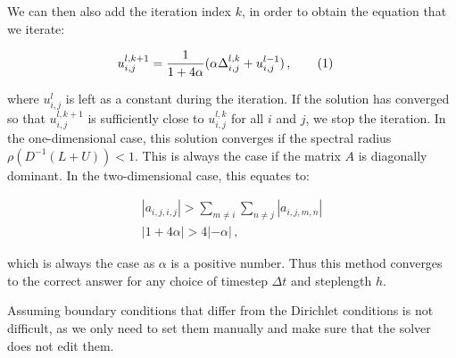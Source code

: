 \documentclass[reprint,english,notitlepage]{revtex4-1}  %
\newcommand\numberthis{\addtocounter{equation}{1}\tag{\theequation}}
\begin{document}
We can then also add the iteration index $k$, in order to obtain the equation that we iterate:

\begin{align*}
u_{i,j}^{l,k+1} &= \frac{1}{1 + 4\alpha} (\alpha \Delta_{i,j}^{l,k} + u_{i,j}^{l-1}) \, , \numberthis \label{eq:2D_diff_eq_jacobi_iter}
\end{align*}

where $u_{i,j}^l$ is left as a constant during the iteration. If the solution has converged so that $u_{i,j}^{l,k+1}$ is sufficiently close to $u_{i,j}^{l,k}$ for all $i$ and $j$, we stop the iteration. In the one-dimensional case, this solution converges if the spectral radius $\rho(D^{-1}(L+U)) < 1$. This is always the case if the matrix $A$ is diagonally dominant. In the two-dimensional case, this equates to:

\begin{align*}
|a_{i,j,i,j}| > \sum\limits_{m\neq i} \sum\limits_{n\neq j} |a_{i,j,m,n}| \\
|1 + 4 \alpha| > 4|-\alpha| \, ,
\end{align*}

which is always the case as $\alpha$ is a positive number. Thus this method converges to the correct answer for any choice of timestep $\Delta t$ and steplength $h$.

Assuming boundary conditions that differ from the Dirichlet conditions is not difficult, as we only need to set them manually and make sure that the solver does not edit them. 





\end{document}
